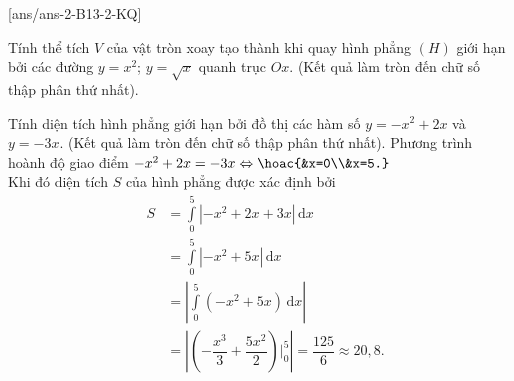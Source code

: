 [ans/ans-2-B13-2-KQ]
\caukq
\begin{ex}%
	Tính thể tích $V$ của vật tròn xoay tạo thành khi quay hình phẳng $(H)$ giới hạn bởi các đường $y=x^2$; $y=\sqrt{x}$ quanh trục $Ox.$ (Kết quả làm tròn đến chữ số thập phân thứ nhất).
\end{ex}
\begin{ex}%
	Tính diện tích hình phẳng giới hạn bởi đồ thị các hàm số $y=-x^2+2x$ và $y=-3x$. (Kết quả làm tròn đến chữ số thập phân thứ nhất).
	\loigiai
	{Phương trình hoành độ giao điểm $-x^2+2x=-3x\Leftrightarrow\hoac{&x=0\\&x=5.}$\\
		Khi đó diện tích $S$ của hình phẳng được xác định bởi
		\begin{eqnarray*}
			&S&=\displaystyle\int \limits_0^5|-x^2+2x+3x|\mathrm{\, d}x\\
			&&=\displaystyle\int\limits_0^5|-x^2+5x|\mathrm{\, d}x\\
			&&=\left| \displaystyle\int\limits_0^5(-x^2+5x)\mathrm{\, d}x\right|\\
			&&=\left| \left(-\dfrac{x^3}{3}+\dfrac{5x^2}{2}\right)\Bigg|_0^5\right| =\dfrac{125}{6}\approx 20{,}8.
		\end{eqnarray*}
		}
\end{ex}
